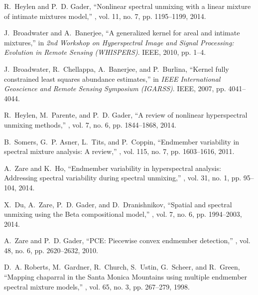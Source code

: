 \documentclass[twocolumn,english]{IEEEtran}
\theoremstyle{plain}
\begin{document}
\begin{thebibliography}{10}
R.~Heylen and P.~D. Gader,
\newblock ``Nonlinear spectral unmixing with a linear mixture of intimate
  mixtures model,''
, vol. 11, no. 7, pp.
  1195--1199, 2014.

J.~Broadwater and A.~Banerjee,
\newblock ``A generalized kernel for areal and intimate mixtures,''
\newblock in {\em 2nd Workshop on Hyperspectral Image and Signal Processing:
  Evolution in Remote Sensing (WHISPERS)}. IEEE, 2010, pp. 1--4.

J.~Broadwater, R.~Chellappa, A.~Banerjee, and P.~Burlina,
\newblock ``Kernel fully constrained least squares abundance estimates,''
\newblock in {\em IEEE International Geoscience and Remote Sensing Symposium
  (IGARSS)}. IEEE, 2007, pp. 4041--4044.

R.~Heylen, M.~Parente, and P.~D. Gader,
\newblock ``A review of nonlinear hyperspectral unmixing methods,''
, vol. 7, no. 6, pp. 1844--1868, 2014.

B.~Somers, G.~P. Asner, L.~Tits, and P.~Coppin,
\newblock ``Endmember variability in spectral mixture analysis: A review,''
, vol. 115, no. 7, pp. 1603--1616,
  2011.

A.~Zare and K.~Ho,
\newblock ``Endmember variability in hyperspectral analysis: Addressing
  spectral variability during spectral unmixing,''
, vol. 31, no. 1, pp. 95--104,
  2014.

X.~Du, A.~Zare, P.~D. Gader, and D.~Dranishnikov,
\newblock ``Spatial and spectral unmixing using the {Beta} compositional
  model,''
, vol. 7, no. 6, pp. 1994--2003, 2014.

A.~Zare and P.~D. Gader,
\newblock ``{PCE}: Piecewise convex endmember detection,''
, vol. 48, no. 6,
  pp. 2620--2632, 2010.

D.~A. Roberts, M.~Gardner, R.~Church, S.~Ustin, G.~Scheer, and R.~Green,
\newblock ``Mapping chaparral in the {Santa Monica Mountains} using multiple
  endmember spectral mixture models,''
, vol. 65, no. 3, pp. 267--279,
  1998.


\end{thebibliography}
\end{document}
